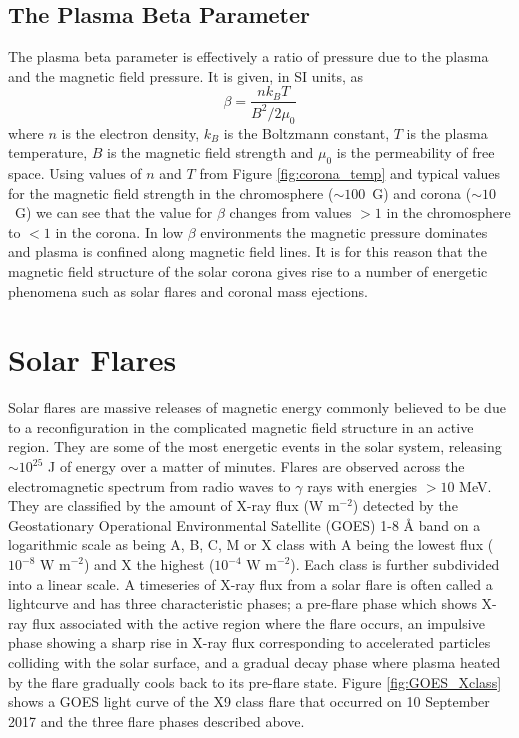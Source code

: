 \subsection{The Plasma Beta Parameter}
The plasma beta parameter is effectively a ratio of pressure due to the plasma and the magnetic field pressure. It is given, in SI units, as
\begin{equation}
\label{eq:pbeta}
\beta = \frac{nk_BT}{B^2/2\mu_0}
\end{equation}
where $n$ is the electron density, $k_B$ is the Boltzmann constant, $T$ is the plasma temperature, $B$ is the magnetic field strength and $\mu_0$ is the permeability of free space. Using values of $n$ and $T$ from Figure \ref{fig:corona_temp} and typical values for the magnetic field strength in the chromosphere ($\sim 100$~G) and corona ($\sim 10$~G) we can see that the value for $\beta$ changes from values $>1$ in the chromosphere to $<1$ in the corona. In low $\beta$ environments the magnetic pressure dominates and plasma is confined along magnetic field lines. It is for this reason that the magnetic field structure of the solar corona gives rise to a number of energetic phenomena such as solar flares and coronal mass ejections.
\section{Solar Flares}
\label{subsec:sf}
Solar flares are massive releases of magnetic energy commonly believed to be due to a reconfiguration in the complicated magnetic field structure in an active region.  They are some of the most energetic events in the solar system, releasing $\sim 10^{25}$ J of energy over a matter of minutes. Flares are observed across the electromagnetic spectrum from radio waves to $\gamma$ rays with energies $> 10$ MeV. They are classified by the amount of X-ray flux (W m$^{-2}$) detected by the Geostationary Operational Environmental Satellite (GOES) 1-8 {\AA} band on a logarithmic scale as being A, B, C, M or X class with A being the lowest flux ($10^{-8} \mbox{ W m}^{-2}$) and X the highest ($10^{-4} \mbox{ W m}^{-2}$). Each class is further subdivided into a linear scale.
A timeseries of X-ray flux from a solar flare is often called a lightcurve and has three characteristic phases; a pre-flare phase which shows X-ray flux associated with the active region where the flare occurs, an impulsive phase showing a sharp rise in X-ray flux corresponding to accelerated particles colliding with the solar surface, and a gradual decay phase where plasma heated by the flare gradually cools back to its pre-flare state. Figure \ref{fig:GOES_Xclass} shows a GOES light curve of the X9 class flare that occurred on 10 September 2017 and the three flare phases described above.

